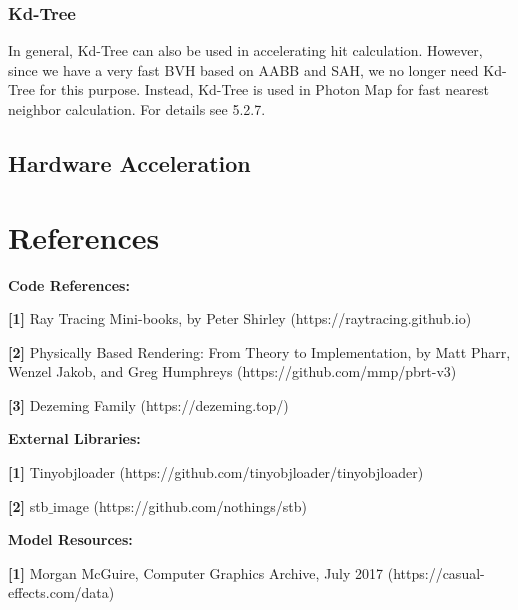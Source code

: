 \documentclass[utf8]{article}
\begin{document}
\subsubsection{Kd-Tree}
In general, Kd-Tree can also be used in accelerating hit calculation. However, since we have a very fast BVH based on AABB and SAH, we no longer need Kd-Tree for this purpose. Instead, Kd-Tree is used in Photon Map for fast nearest neighbor calculation. For details see 5.2.7.

\subsection{Hardware Acceleration}

\section{References}
\noindent
\textbf{Code References: }

\noindent
\textbf{[1]} Ray Tracing Mini-books, by Peter Shirley (https://raytracing.github.io)

\noindent
\textbf{[2]} Physically Based Rendering: From Theory to Implementation, by Matt Pharr, Wenzel Jakob, and Greg Humphreys (https://github.com/mmp/pbrt-v3)

\noindent
\textbf{[3]} Dezeming Family (https://dezeming.top/)

\noindent
\textbf{External Libraries: }

\noindent
\textbf{[1]} Tinyobjloader (https://github.com/tinyobjloader/tinyobjloader)

\noindent
\textbf{[2]} stb$\_$image (https://github.com/nothings/stb)

\noindent
\textbf{Model Resources: }

\noindent
\textbf{[1]} Morgan McGuire, Computer Graphics Archive, July 2017 (https://casual-effects.com/data)
\end{document}
